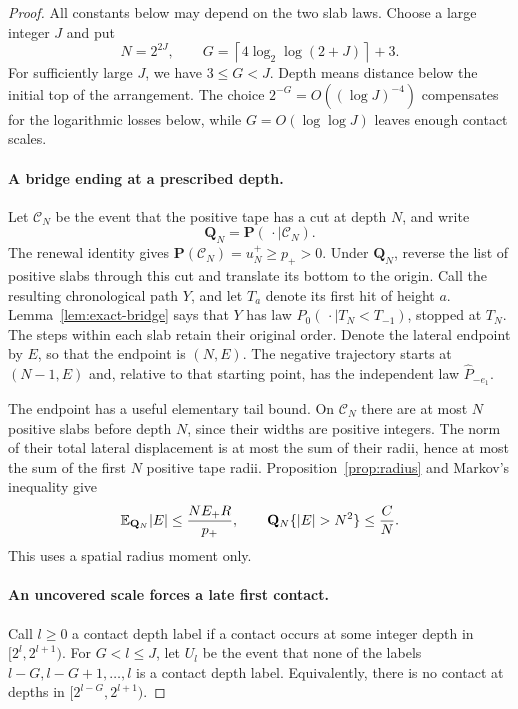 \begin{proof}
All constants below may depend on the two slab laws.  Choose a large
integer $J$ and put
\begin{equation}\label{eq:lower-parameters}
 N=2^{2J},\qquad
 G=\left\lceil4\log_2\log(2+J)\right\rceil+3.
\end{equation}
For sufficiently large $J$, we have $3\le G<J$.  Depth means distance
below the initial top of the arrangement.
The choice $2^{-G}=O((\log J)^{-4})$ compensates for the logarithmic
losses below, while $G=O(\log\log J)$ leaves enough contact scales.

\paragraph{A bridge ending at a prescribed depth.}
Let $\mathcal C_N$ be the event that the positive tape has a cut at
depth $N$, and write
\[
 \mathbf Q_N=\mathbf P(\,\cdot\mid\mathcal C_N).
\]
The renewal identity gives
$\mathbf P(\mathcal C_N)=u_N^+\ge p_+>0$.
Under $\mathbf Q_N$, reverse the list of positive slabs through this cut
and translate its bottom to the origin.  Call the resulting chronological
path $Y$, and let $T_a$ denote its first hit of height $a$.
Lemma~\ref{lem:exact-bridge} says that $Y$ has law
$P_0(\,\cdot\mid T_N<T_{-1})$, stopped at $T_N$.
The steps within each slab retain their original order.  Denote the
lateral endpoint by $E$, so that the endpoint is $(N,E)$.  The negative
trajectory starts at $(N-1,E)$ and, relative to that starting point,
has the independent law $\widehat P_{-e_1}$.

The endpoint has a useful elementary tail bound.  On $\mathcal C_N$
there are at most $N$ positive slabs before depth $N$, since their
widths are positive integers.  The norm of their total lateral
displacement is at most the sum of their radii, hence at most the sum
of the first $N$ positive tape radii.  Proposition~\ref{prop:radius}
and Markov's inequality give
\begin{equation}\label{eq:lower-endpoint-tail}
 \EE_{\mathbf Q_N}|E|
 \le \frac{N E_+R}{p_+},
 \qquad
 \mathbf Q_N\{|E|>N^2\}\le \frac{C}{N}.
\end{equation}
This uses a spatial radius moment only.

\paragraph{An uncovered scale forces a late first contact.}
Call $l\ge0$ a contact depth label if a contact occurs at some integer
depth in $[2^l,2^{l+1})$.  For $G<l\le J$, let $U_l$ be the event
that none of the labels $l-G,l-G+1,\ldots,l$ is a contact depth label.
Equivalently, there is no contact at depths in
$[2^{l-G},2^{l+1})$.


\end{proof}
